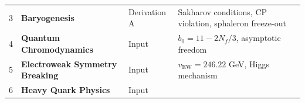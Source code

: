 \documentclass[
  11pt,
]{article}
\begin{document}
\begin{longtable}[]{@{}llll@{}}
\begin{minipage}[t]{0.04\columnwidth}
3\strut
\end{minipage} & \begin{minipage}[t]{0.27\columnwidth}\raggedright
\textbf{Baryogenesis}\strut
\end{minipage} & \begin{minipage}[t]{0.29\columnwidth}\raggedright
Derivation A\strut
\end{minipage} & \begin{minipage}[t]{0.29\columnwidth}\raggedright
Sakharov conditions, CP violation, sphaleron freeze-out\strut
\end{minipage}\tabularnewline
\begin{minipage}[t]{0.04\columnwidth}\raggedright
4\strut
\end{minipage} & \begin{minipage}[t]{0.27\columnwidth}\raggedright
\textbf{Quantum Chromodynamics}\strut
\end{minipage} & \begin{minipage}[t]{0.29\columnwidth}\raggedright
Input\strut
\end{minipage} & \begin{minipage}[t]{0.29\columnwidth}\raggedright
\(b_0 = 11 - 2N_f/3\), asymptotic freedom\strut
\end{minipage}\tabularnewline
\begin{minipage}[t]{0.04\columnwidth}\raggedright
5\strut
\end{minipage} & \begin{minipage}[t]{0.27\columnwidth}\raggedright
\textbf{Electroweak Symmetry Breaking}\strut
\end{minipage} & \begin{minipage}[t]{0.29\columnwidth}\raggedright
Input\strut
\end{minipage} & \begin{minipage}[t]{0.29\columnwidth}\raggedright
\(v_{\text{EW}} = 246.22\) GeV, Higgs mechanism\strut
\end{minipage}\tabularnewline
\begin{minipage}[t]{0.04\columnwidth}\raggedright
6\strut
\end{minipage} & \begin{minipage}[t]{0.27\columnwidth}\raggedright
\textbf{Heavy Quark Physics}\strut
\end{minipage} & \begin{minipage}[t]{0.29\columnwidth}\raggedright
Input\strut
\end{minipage} & \begin{minipage}[t]{0.29\columnwidth}\raggedright

\end{minipage}
\end{longtable}
\end{document}
